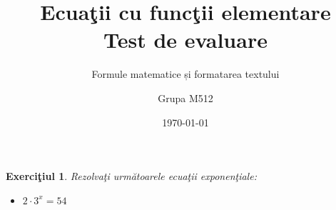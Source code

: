 \documentclass[a4paper, 12pt]{scrartcl}
\title{
    Ecua\c tii cu func\c tii elementare \\
    \large {Test de evaluare}
}
\subtitle{Formule matematice și formatarea textului}
\author{\color{DarkSlateGray}{Teodor Chelmuș}\color{Tomato}{\thanks{teodor.chelmus@uaic.ro}} \and Grupa M512}
\date{\today}
\theoremstyle{plain}
\newtheorem{exercitiu}{Exerci\c tiul}
\begin{document}
\maketitle

\begin{exercitiu}
    Rezolva\c ti urm\u atoarele ecua\c tii exponen\c tiale:

    \begin{itemize}
        \item \(2 \cdot  3^x = 54\)
    \end{itemize}
\end{exercitiu}
\end{document}
